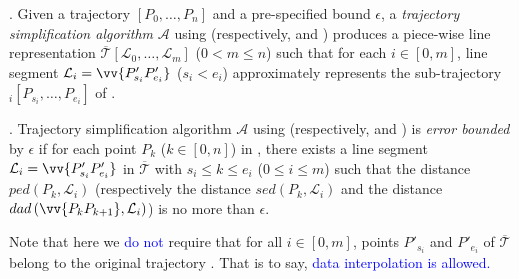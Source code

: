 
\stitle{\textcolor{blue}{Trajectory simplification algorithms}}. Given a trajectory $\left[P_0, \dots, P_n\right]$ and  a pre-specified bound $\epsilon$, a \emph{trajectory simplification algorithm} $\mathcal{A}$ using \ped  (respectively, \sed and \dad) produces a piece-wise line representation $\overline{\mathcal{T}}\left[\mathcal{L}_0, \ldots, \mathcal{L}_m\right]$ ($0< m \le n$) such that for each $i\in[0, m]$, line segment $\mathcal{L}_i = \vv{P'_{s_i}P'_{e_i}}$ ($s_i < e_i$) approximately represents the sub-trajectory $_i\left[P_{s_i}, \dots, P_{e_i}\right]$ of .

\stitle{\textcolor{blue}{Error bounded algorithms}}.
Trajectory simplification algorithm $\mathcal{A}$ using \ped  (respectively, \sed and \dad) is \emph{error bounded} by $\epsilon$ if for each point $P_k$ ($k\in[0,n]$) in , there exists a line segment $\mathcal{L}_i = \vv{P'_{s_i}P'_{e_i}}$ in $\overline{\mathcal{T}}$ with $s_i \le k \le e_i$ ($0\le i\le m$) such that the \ped distance $ped\left(P_k, \mathcal{L}_i\right)$  (respectively the \sed distance $sed\left(P_k, \mathcal{L}_i\right)$ and the \dad distance $dad\left(\vv{P_{k}P_{k+1}}, \mathcal{L}_i\right)$) is no more than  $\epsilon$.
%
 
Note that here we \textcolor{blue}{do not} require that for all $i\in[0,m]$, points $P'_{s_i}$ and $P'_{e_i}$ of $\overline{\mathcal{T}}$ belong to the original trajectory . That is to say, \textcolor{blue}{data interpolation is allowed.}
